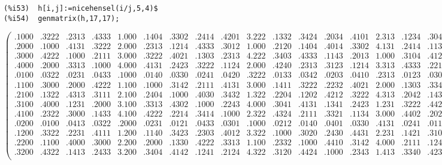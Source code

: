 \documentclass[fleqn]{cas-sc}
\begin{document}
\begin{verbatim}
(%i53)	h[i,j]:=nicehensel(i/j,5,4)$
(%i54)	genmatrix(h,17,17);
\end{verbatim}
\setcounter{MaxMatrixCols}{20}
\begin{sideways}
\begin{minipage}{\textheight}
\[
\begin{pmatrix}
.1000 & .3222 & .2313 & .4333 & 1.000 & .1404 & .3302 & .2414 & .4201 & 3.222 & .1332 & .3424 & .2034 & .4101 & 2.313 & .1234 & .3043\\
.2000 & .1000 & .4131 & .3222 & 2.000 & .2313 & .1214 & .4333 & .3012 & 1.000 & .2120 & .1404 & .4014 & .3302 & 4.131 & .2414 & .1132\\
.3000 & .4222 & .1000 & .2111 & 3.000 & .3222 & .4021 & .1303 & .2313 & 4.222 & .3403 & .4333 & .1143 & .2013 & 1.000 & .3104 & .4121\\
.4000 & .2000 & .3313 & .1000 & 4.000 & .4131 & .2423 & .3222 & .1124 & 2.000 & .4240 & .2313 & .3123 & .1214 & 3.313 & .4333 & .2210\\
.0100 & .0322 & .0231 & .0433 & .1000 & .0140 & .0330 & .0241 & .0420 & .3222 & .0133 & .0342 & .0203 & .0410 & .2313 & .0123 & .0304\\
.1100 & .3000 & .2000 & .4222 & 1.100 & .1000 & .3142 & .2111 & .4131 & 3.000 & .1411 & .3222 & .2232 & .4021 & 2.000 & .1303 & .3342\\
.2100 & .1322 & .4313 & .3111 & 2.100 & .2404 & .1000 & .4030 & .3432 & 1.322 & .2204 & .1202 & .4212 & .3222 & 4.313 & .2042 & .1431\\
.3100 & .4000 & .1231 & .2000 & 3.100 & .3313 & .4302 & .1000 & .2243 & 4.000 & .3041 & .4131 & .1341 & .2423 & 1.231 & .3222 & .4420\\
.4100 & .2322 & .3000 & .1433 & 4.100 & .4222 & .2214 & .3414 & .1000 & 2.322 & .4324 & .2111 & .3321 & .1134 & 3.000 & .4402 & .2024\\
.0200 & .0100 & .0413 & .0322 & .2000 & .0231 & .0121 & .0433 & .0301 & .1000 & .0212 & .0140 & .0401 & .0330 & .4131 & .0241 & .0113\\
.1200 & .3322 & .2231 & .4111 & 1.200 & .1140 & .3423 & .2303 & .4012 & 3.322 & .1000 & .3020 & .2430 & .4431 & 2.231 & .1421 & .3102\\
.2200 & .1100 & .4000 & .3000 & 2.200 & .2000 & .1330 & .4222 & .3313 & 1.100 & .2332 & .1000 & .4410 & .3142 & 4.000 & .2111 & .1240\\
.3200 & .4322 & .1413 & .2433 & 3.200 & .3404 & .4142 & .1241 & .2124 & 4.322 & .3120 & .4424 & .1000 & .2343 & 1.413 & .3340 & .4234\\

\end{pmatrix}\]
\end{minipage}
\end{sideways}
\end{document}
